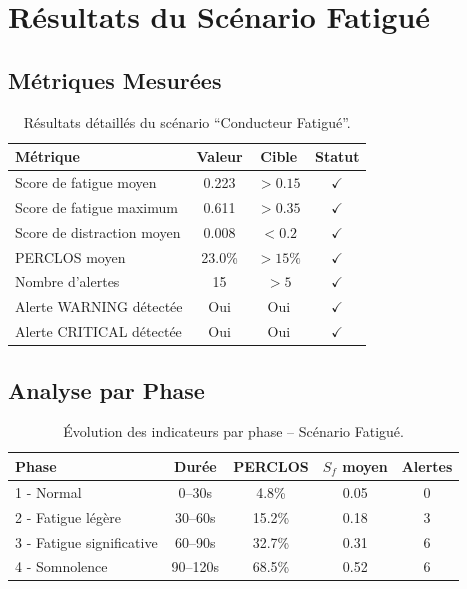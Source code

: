 \section{Résultats du Scénario Fatigué}

\subsection{Métriques Mesurées}

\begin{table}[H]
\centering
\caption{Résultats détaillés du scénario ``Conducteur Fatigué''.}
\label{tab:results_fatigue}
\renewcommand{\arraystretch}{1.3}
\begin{tabular}{|l|c|c|c|}
\hline
\rowcolor{alertorange!20}
\textbf{Métrique} & \textbf{Valeur} & \textbf{Cible} & \textbf{Statut} \\
\hline
Score de fatigue moyen & 0.223 & $> 0.15$ & $\checkmark$ \\
\hline
Score de fatigue maximum & 0.611 & $> 0.35$ & $\checkmark$ \\
\hline
Score de distraction moyen & 0.008 & $< 0.2$ & $\checkmark$ \\
\hline
PERCLOS moyen & 23.0\% & $> 15\%$ & $\checkmark$ \\
\hline
Nombre d'alertes & 15 & $> 5$ & $\checkmark$ \\
\hline
Alerte WARNING détectée & Oui & Oui & $\checkmark$ \\
\hline
Alerte CRITICAL détectée & Oui & Oui & $\checkmark$ \\
\hline
\end{tabular}
\end{table}

\subsection{Analyse par Phase}

\begin{table}[H]
\centering
\caption{Évolution des indicateurs par phase -- Scénario Fatigué.}
\label{tab:fatigue_phases}
\renewcommand{\arraystretch}{1.3}
\begin{tabular}{|l|c|c|c|c|}
\hline
\rowcolor{stellantisblue!15}
\textbf{Phase} & \textbf{Durée} & \textbf{PERCLOS} & \textbf{$S_f$ moyen} & \textbf{Alertes} \\
\hline
1 - Normal & 0--30s & 4.8\% & 0.05 & 0 \\
\hline
2 - Fatigue légère & 30--60s & 15.2\% & 0.18 & 3 \\
\hline
3 - Fatigue significative & 60--90s & 32.7\% & 0.31 & 6 \\
\hline
4 - Somnolence & 90--120s & 68.5\% & 0.52 & 6 \\
\hline
\end{tabular}
\end{table}

